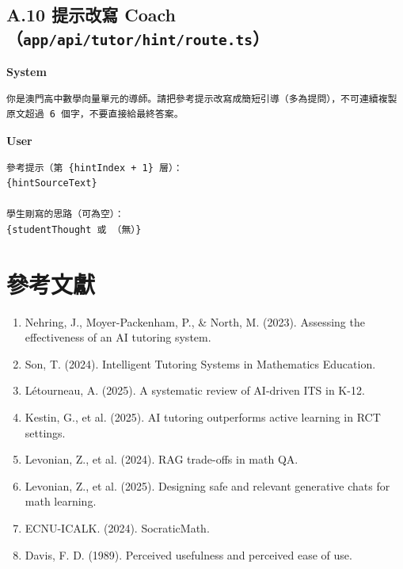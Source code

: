 \documentclass[12pt,a4paper]{article}
\begin{document}
\subsection*{A.10 提示改寫 Coach（\texttt{app/api/tutor/hint/route.ts}）}
\textbf{System}
\begin{verbatim}
你是澳門高中數學向量單元的導師。請把參考提示改寫成簡短引導（多為提問），不可連續複製原文超過 6 個字，不要直接給最終答案。
\end{verbatim}
\textbf{User}
\begin{verbatim}
參考提示（第 {hintIndex + 1} 層）：
{hintSourceText}

學生剛寫的思路（可為空）：
{studentThought 或 （無）}
\end{verbatim}

\section*{參考文獻}
\begin{enumerate}[leftmargin=2em]
  \item Nehring, J., Moyer-Packenham, P., \& North, M. (2023). Assessing the effectiveness of an AI tutoring system.
  \item Son, T. (2024). Intelligent Tutoring Systems in Mathematics Education.
  \item L\'etourneau, A. (2025). A systematic review of AI-driven ITS in K-12.
  \item Kestin, G., et al. (2025). AI tutoring outperforms active learning in RCT settings.
  \item Levonian, Z., et al. (2024). RAG trade-offs in math QA.
  \item Levonian, Z., et al. (2025). Designing safe and relevant generative chats for math learning.
  \item ECNU-ICALK. (2024). SocraticMath.
  \item Davis, F. D. (1989). Perceived usefulness and perceived ease of use.
\end{enumerate}
\end{document}
